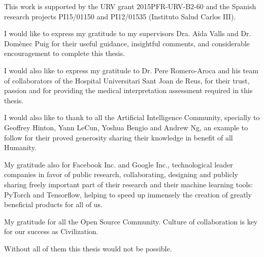 \documentclass[
11pt, %
english, %
singlespacing, %
headsepline, %
]{MastersDoctoralThesis} %
\theoremstyle{definition}
\theoremstyle{definition} %
\theoremstyle{remark}
\begin{document}
\begin{acknowledgements}
\addchaptertocentry{\acknowledgementname} %

This work is supported by the URV grant 2015PFR-URV-B2-60 and the Spanish research projects PI15/01150 and PI12/01535 (Instituto Salud Carlos III). 

I would like to express my gratitude to my supervisors Dra. A\"ida Valls and Dr. Dom\`enec Puig for their useful guidance, insightful comments, and considerable encouragement to complete this thesis. 

I would also like to express my gratitude to Dr. Pere Romero-Aroca and his team of collaborators of the Hospital Universitari Sant Joan de Reus, for their trust, passion and for providing the medical interpretation assessment required in this thesis.

I would also like to thank to all the Artificial Intelligence Community, specially to Geoffrey Hinton, Yann LeCun, Yoshua Bengio and Andrew Ng, an example to follow for their proved generosity sharing their knowledge in benefit of all Humanity. 

My gratitude also for Facebook Inc. and Google Inc., technological leader companies in favor of public research, collaborating, designing and publicly sharing freely important part of their research and their machine learning tools: PyTorch and Tensorflow, helping to speed up immensely the creation of greatly beneficial products for all of us. 

My gratitude for all the Open Source Community. Culture of collaboration is key for our success as Civilization. 

Without all of them this thesis would not be possible.

\end{acknowledgements}



\tableofcontents %

\listoffigures %

\listoftables %

\end{document}
